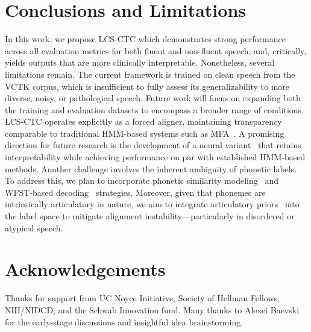 \vspace{-0.3em}
\section{Conclusions and Limitations}

In this work, we propose LCS-CTC which demonstrates strong performance across all evaluation metrics for both fluent and non-fluent speech, and, critically, yields outputs that are more clinically interpretable. Nonetheless, several limitations remain. The current framework is trained on clean speech from the VCTK corpus, which is insufficient to fully assess its generalizability to more diverse, noisy, or pathological speech. Future work will focus on expanding both the training and evaluation datasets to encompass a broader range of conditions. LCS-CTC operates explicitly as a forced aligner, maintaining transparency comparable to traditional HMM-based systems such as MFA~\cite{mcauliffe17_interspeech}. A promising direction for future research is the development of a neural variant~\cite{pratap2024scaling-mms, zhu2022phone-w2v2-alignment, li2022neufa, seamless2025joint} that retains interpretability while achieving performance on par with established HMM-based methods. Another challenge involves the inherent ambiguity of phonetic labels. To address this, we plan to incorporate phonetic similarity modeling~\cite{zhou2025phonetic-error-detection} and WFST-based decoding~\cite{guo2025dysfluentwfstframeworkzeroshot, li2025k} strategies. Moreover, given that phonemes are intrinsically articulatory in nature, we aim to integrate articulatory priors~\cite{cho2024jstsp-sparc, ssdm, lian22bcsnmf, lian2023factor} into the label space to mitigate alignment instability—particularly in disordered or atypical speech.


\vspace{-0.3em}
\section{Acknowledgements}
Thanks for support from UC Noyce Initiative, Society of Hellman Fellows, NIH/NIDCD, and the Schwab Innovation fund. Many thanks to Alexei Baevski for the early-stage discussions and insightful idea brainstorming.